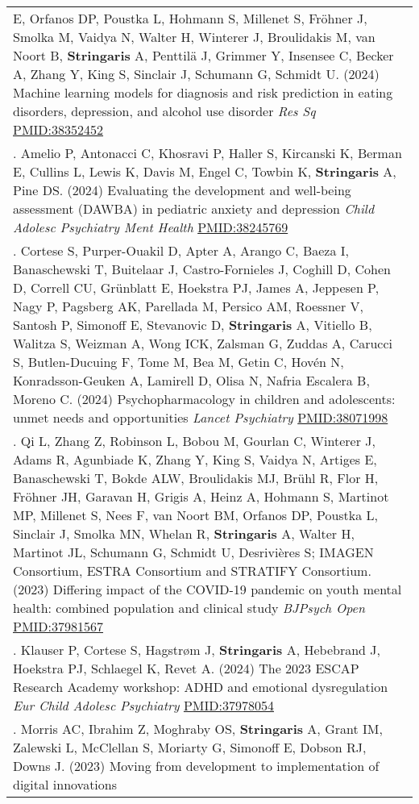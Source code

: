 \documentclass[
]{article}
\begin{document}
\begin{longtable}[]{@{}
  >{\raggedright\arraybackslash}p{}@{}}
E, Orfanos DP, Poustka L, Hohmann S, Millenet S, Fröhner J, Smolka M,
Vaidya N, Walter H, Winterer J, Broulidakis M, van Noort B,
\textbf{Stringaris} A, Penttilä J, Grimmer Y, Insensee C, Becker A,
Zhang Y, King S, Sinclair J, Schumann G, Schmidt U. (2024) Machine
learning models for diagnosis and risk prediction in eating disorders,
depression, and alcohol use disorder \emph{Res Sq}
\url{PMID:38352452} \\
8. Amelio P, Antonacci C, Khosravi P, Haller S, Kircanski K, Berman E,
Cullins L, Lewis K, Davis M, Engel C, Towbin K, \textbf{Stringaris} A,
Pine DS. (2024) Evaluating the development and well-being assessment
(DAWBA) in pediatric anxiety and depression \emph{Child Adolesc
Psychiatry Ment Health} \url{PMID:38245769} \\
9. Cortese S, Purper-Ouakil D, Apter A, Arango C, Baeza I, Banaschewski
T, Buitelaar J, Castro-Fornieles J, Coghill D, Cohen D, Correll CU,
Grünblatt E, Hoekstra PJ, James A, Jeppesen P, Nagy P, Pagsberg AK,
Parellada M, Persico AM, Roessner V, Santosh P, Simonoff E, Stevanovic
D, \textbf{Stringaris} A, Vitiello B, Walitza S, Weizman A, Wong ICK,
Zalsman G, Zuddas A, Carucci S, Butlen-Ducuing F, Tome M, Bea M, Getin
C, Hovén N, Konradsson-Geuken A, Lamirell D, Olisa N, Nafria Escalera B,
Moreno C. (2024) Psychopharmacology in children and adolescents: unmet
needs and opportunities \emph{Lancet Psychiatry} \url{PMID:38071998} \\
10. Qi L, Zhang Z, Robinson L, Bobou M, Gourlan C, Winterer J, Adams R,
Agunbiade K, Zhang Y, King S, Vaidya N, Artiges E, Banaschewski T, Bokde
ALW, Broulidakis MJ, Brühl R, Flor H, Fröhner JH, Garavan H, Grigis A,
Heinz A, Hohmann S, Martinot MP, Millenet S, Nees F, van Noort BM,
Orfanos DP, Poustka L, Sinclair J, Smolka MN, Whelan R,
\textbf{Stringaris} A, Walter H, Martinot JL, Schumann G, Schmidt U,
Desrivières S; IMAGEN Consortium, ESTRA Consortium and STRATIFY
Consortium. (2023) Differing impact of the COVID-19 pandemic on youth
mental health: combined population and clinical study \emph{BJPsych
Open} \url{PMID:37981567} \\
11. Klauser P, Cortese S, Hagstrøm J, \textbf{Stringaris} A, Hebebrand
J, Hoekstra PJ, Schlaegel K, Revet A. (2024) The 2023 ESCAP Research
Academy workshop: ADHD and emotional dysregulation \emph{Eur Child
Adolesc Psychiatry} \url{PMID:37978054} \\
12. Morris AC, Ibrahim Z, Moghraby OS, \textbf{Stringaris} A, Grant IM,
Zalewski L, McClellan S, Moriarty G, Simonoff E, Dobson RJ, Downs J.
(2023) Moving from development to implementation of digital innovations

\end{longtable}
\end{document}
